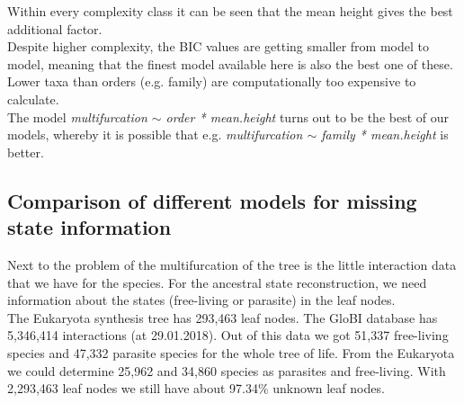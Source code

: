       Within every complexity class it can be seen that the mean height gives the best additional factor. \\
      Despite higher complexity, the BIC values are getting smaller from model to model, meaning that 
        the finest model available here is also the best one of these. Lower taxa than orders (e.g. 
        family) are computationally too expensive to calculate. \\
      The model \textit{multifurcation $\sim$ order * mean.height} turns out to be the best of our models, 
        whereby it is possible that e.g. \textit{multifurcation $\sim$ family * mean.height} is better. \\

    \subsection{Comparison of different models for missing state information}
      Next to the problem of the multifurcation of the tree is the little interaction data that we have 
        for the species. For the ancestral state reconstruction, we need information about the states 
        (free-living or parasite) in the leaf nodes. \\
      The Eukaryota synthesis tree has 293,463 leaf nodes. The GloBI database has 5,346,414 interactions 
        (at 29.01.2018). Out of this data we got 51,337 free-living species and 47,332 parasite species 
        for the whole tree of life. From the Eukaryota we could determine 25,962 and 34,860 species as 
        parasites and free-living. With 2,293,463 leaf nodes we still have about 97.34\% unknown leaf 
        nodes.
      
